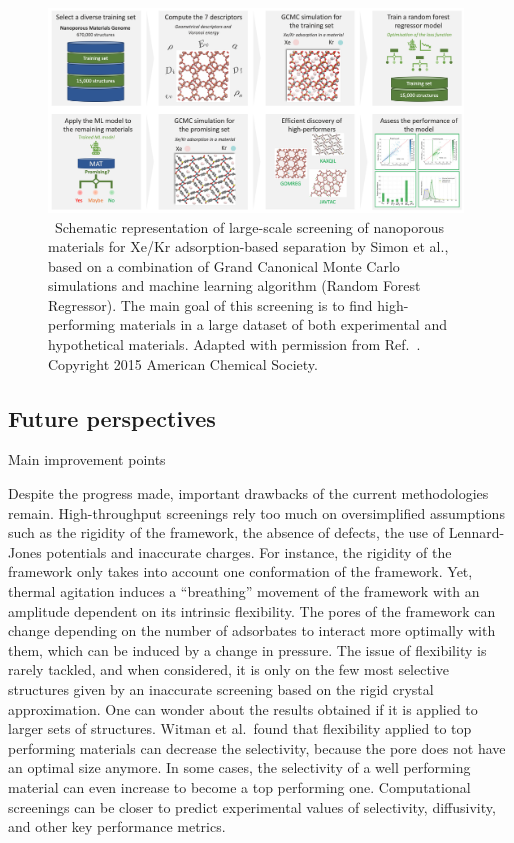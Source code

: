 \documentclass[main.tex]{subfiles}
\begin{document}
\begin{figure}[t]
    \centering
    \includegraphics[width=0.98\textwidth]{figures/1-screening/Simon.jpg}
    \caption{\ Schematic representation of large-scale screening of nanoporous materials for Xe/Kr adsorption-based separation by Simon et al.,\cite{Simon_2015} based on a combination of Grand Canonical Monte Carlo simulations and machine learning algorithm (Random Forest Regressor). The main goal of this screening is to find high-performing materials in a large dataset of both experimental and hypothetical materials. 
    Adapted with permission from Ref.~. Copyright 2015 American Chemical Society.
    }\label{fgr:Simon}
\end{figure}

\subsection{Future perspectives}

Main improvement points

Despite the progress made, important drawbacks of the current methodologies remain. High-throughput screenings rely too much on oversimplified assumptions such as the rigidity of the framework, the absence of defects, the use of Lennard-Jones potentials and inaccurate charges. For instance, the rigidity of the framework only takes into account one conformation of the framework. Yet, thermal agitation induces a ``breathing'' movement of the framework with an amplitude dependent on its intrinsic flexibility. The pores of the framework can change depending on the number of adsorbates to interact more optimally with them, which can be induced by a change in pressure. The issue of flexibility is rarely tackled, and when considered, it is only on the few most selective structures given by an inaccurate screening based on the rigid crystal approximation. One can wonder about the results obtained if it is applied to larger sets of structures. Witman et al.\ found that flexibility applied to top performing materials can decrease the selectivity, because the pore does not have an optimal size anymore.\cite{Witman_2017} In some cases, the selectivity of a well performing material can even increase to become a top performing one. Computational screenings can be closer to predict experimental values of selectivity, diffusivity, and other key performance metrics.
\end{document}
